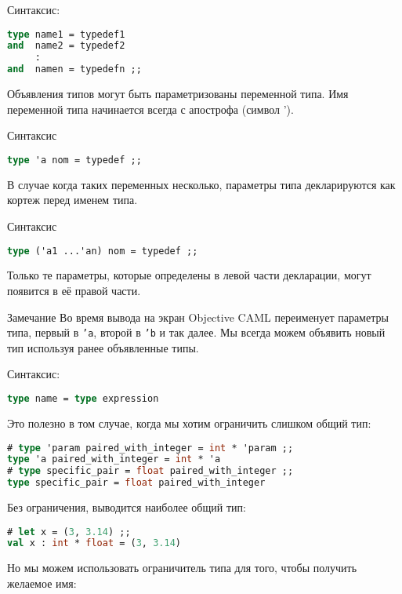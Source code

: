 Синтаксис:

\begin{lstlisting}[language=OCaml]
type name1 = typedef1
and  name2 = typedef2
     :
and  namen = typedefn ;;
\end{lstlisting}

Объявления типов могут быть параметризованы переменной типа. Имя переменной типа
начинается всегда с апострофа (символ ').

Синтаксис

\begin{lstlisting}[language=OCaml]
type 'a nom = typedef ;;
\end{lstlisting}

В случае когда таких переменных несколько, параметры типа декларируются как
кортеж перед именем типа.

Синтаксис

\begin{lstlisting}[language=OCaml]
type ('a1 ...'an) nom = typedef ;;
\end{lstlisting}

Только те параметры, которые определены в левой части декларации, могут появится
в её правой части.


Замечание
Во время вывода на экран Objective CAML переименует параметры типа, первый в
\texttt{'a}, второй в \texttt{'b} и так далее. Мы всегда можем объявить новый
тип используя ранее объявленные типы.

Синтаксис:

\begin{lstlisting}[language=OCaml]
type name = type expression
\end{lstlisting}

Это полезно в том случае, когда мы хотим ограничить слишком общий тип:

\begin{lstlisting}[language=OCaml]
# type 'param paired_with_integer = int * 'param ;;
type 'a paired_with_integer = int * 'a
# type specific_pair = float paired_with_integer ;;
type specific_pair = float paired_with_integer
\end{lstlisting}

Без ограничения, выводится наиболее общий тип:

\begin{lstlisting}[language=OCaml]
# let x = (3, 3.14) ;;
val x : int * float = (3, 3.14)
\end{lstlisting}

Но мы можем использовать ограничитель типа для того, чтобы получить желаемое
имя:

